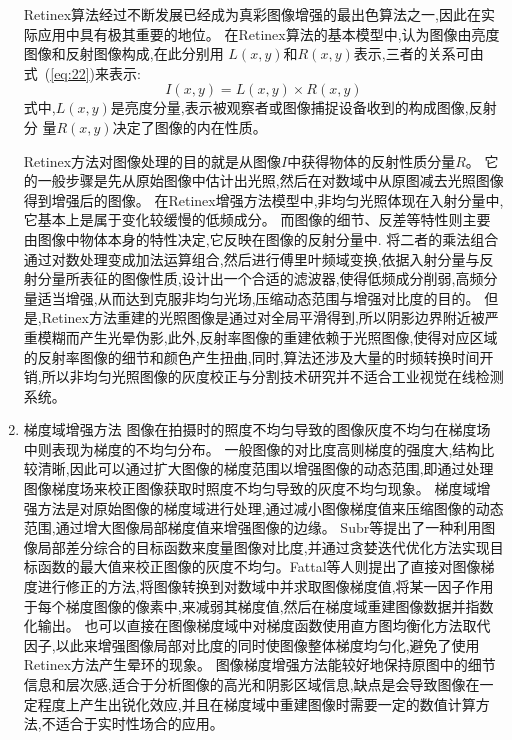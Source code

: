 \documentclass{amsart}
\begin{document}
\begin{enumerate}
  Retinex算法经过不断发展已经成为真彩图像增强的最出色算法之一,因此在实际应用中具有极其重要的地位。
  在Retinex算法的基本模型中,认为图像由亮度图像和反射图像构成,在此分别用
  $L(x,y)$和$R(x,y)$表示,三者的关系可由式~(\ref{eq:22})来表示:
  \begin{equation}
    \label{eq:22}
I(x,y)=L(x,y)\times R(x,y)
  \end{equation}
式中,$L(x,y)$是亮度分量,表示被观察者或图像捕捉设备收到的构成图像,反射分
量$R(x,y)$决定了图像的内在性质。

Retinex方法对图像处理的目的就是从图像$I$中获得物体的反射性质分量$R$。
它的一般步骤是先从原始图像中估计出光照,然后在对数域中从原图减去光照图像得到增强后的图像。
在Retinex增强方法模型中,非均匀光照体现在入射分量中,它基本上是属于变化较缓慢的低频成分。
而图像的细节、反差等特性则主要由图像中物体本身的特性决定,它反映在图像的反射分量中.
将二者的乘法组合通过对数处理变成加法运算组合,然后进行傅里叶频域变换,依据入射分量与反射分量所表征的图像性质,设计出一个合适的滤波器,使得低频成分削弱,高频分量适当增强,从而达到克服非均匀光场,压缩动态范围与增强对比度的目的。
但是,Retinex方法重建的光照图像是通过对全局平滑得到,所以阴影边界附近被严重模糊而产生光晕伪影,此外,反射率图像的重建依赖于光照图像,使得对应区域的反射率图像的细节和颜色产生扭曲,同时,算法还涉及大量的时频转换时间开销,所以非均匀光照图像的灰度校正与分割技术研究并不适合工业视觉在线检测系统。
\item 梯度域增强方法
  图像在拍摄时的照度不均匀导致的图像灰度不均匀在梯度场中则表现为梯度的不均匀分布。
  一般图像的对比度高则梯度的强度大,结构比较清晰,因此可以通过扩大图像的梯度范围以增强图像的动态范围,即通过处理图像梯度场来校正图像获取时照度不均匀导致的灰度不均匀现象。
  梯度域增强方法是对原始图像的梯度域进行处理,通过减小图像梯度值来压缩图像的动态范围,通过增大图像局部梯度值来增强图像的边缘。
  Subr等提出了一种利用图像局部差分综合的目标函数来度量图像对比度,并通过贪婪迭代优化方法实现目标函数的最大值来校正图像的灰度不均匀。Fattal等人则提出了直接对图像梯度进行修正的方法,将图像转换到对数域中并求取图像梯度值,将某一因子作用于每个梯度图像的像素中,来减弱其梯度值,然后在梯度域重建图像数据并指数化输出。
  也可以直接在图像梯度域中对梯度函数使用直方图均衡化方法取代因子,以此来增强图像局部对比度的同时使图像整体梯度均匀化,避免了使用Retinex方法产生晕环的现象。
图像梯度增强方法能较好地保持原图中的细节信息和层次感,适合于分析图像的高光和阴影区域信息,缺点是会导致图像在一定程度上产生出锐化效应,并且在梯度域中重建图像时需要一定的数值计算方法,不适合于实时性场合的应用。


\end{enumerate}
\end{document}
